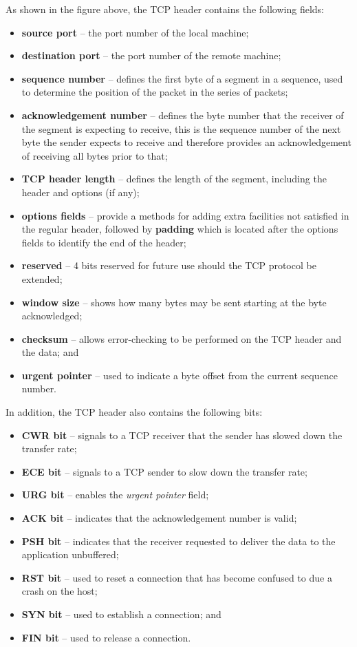\documentclass[a4paper]{systems-software}
\begin{document}
As shown in the figure above, the TCP header contains the following fields:
\begin{itemize}
	\item \textbf{source port} -- the port number of the local machine;
	\item \textbf{destination port} -- the port number of the remote machine;
	\item \textbf{sequence number} -- defines the first byte of a segment in a sequence, used to determine the position of the packet in the series of packets;
	\item \textbf{acknowledgement number} -- defines the byte number that the receiver of the segment is expecting to receive, this is the sequence number of the next byte the sender expects to receive and therefore provides an acknowledgement of receiving all bytes prior to that;
	\item \textbf{TCP header length} -- defines the length of the segment, including the header and options (if any);
	\item \textbf{options fields} -- provide a methods for adding extra facilities not satisfied in the regular header, followed by \textbf{padding} which is located after the options fields to identify the end of the header;
	\item \textbf{reserved} -- 4 bits reserved for future use should the TCP protocol be extended;
	\item \textbf{window size} -- shows how many bytes may be sent starting at the byte acknowledged;
	\item \textbf{checksum} -- allows error-checking to be performed on the TCP header and the data; and
	\item \textbf{urgent pointer} -- used to indicate a byte offset from the current sequence number. 
\end{itemize}

In addition, the TCP header also contains the following bits:
\begin{itemize}
	\item \textbf{CWR bit} -- signals to a TCP receiver that the sender has slowed down the transfer rate;
	\item \textbf{ECE bit} -- signals to a TCP sender to slow down the transfer rate;
	\item \textbf{URG bit} -- enables the \textit{urgent pointer} field;
	\item \textbf{ACK bit} -- indicates that the acknowledgement number is valid;
	\item \textbf{PSH bit} -- indicates that the receiver requested to deliver the data to the application unbuffered;
	\item \textbf{RST bit} -- used to reset a connection that has become confused to due a crash on the host;
	\item \textbf{SYN bit} -- used to establish a connection; and
	\item \textbf{FIN bit} -- used to release a connection.
\end{itemize}
\end{document}
